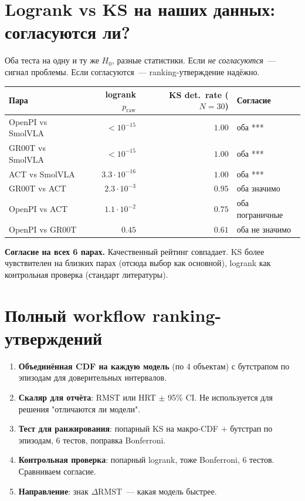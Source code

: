 \documentclass[11pt]{article}
\begin{document}
\section{Logrank vs KS на наших данных: согласуются ли?}

Оба теста на одну и ту же $H_0$, разные статистики. Если \emph{не согласуются}~--- сигнал проблемы. Если согласуются~--- ranking-утверждение надёжно.

\begin{center}
\begin{tabular}{lrrl}
\toprule
Пара & logrank $p_{\text{raw}}$ & KS det.\ rate ($N{=}30$) & Согласие \\
\midrule
OpenPI vs SmolVLA & $<10^{-15}$ & $1.00$ & оба ***  \\
GR00T  vs SmolVLA & $<10^{-15}$ & $1.00$ & оба ***  \\
ACT    vs SmolVLA & $3.3\!\cdot\!10^{-16}$ & $1.00$ & оба ***  \\
GR00T  vs ACT     & $2.3\!\cdot\!10^{-3}$  & $0.95$ & оба значимо \\
OpenPI vs ACT     & $1.1\!\cdot\!10^{-2}$  & $0.75$ & оба пограничные \\
OpenPI vs GR00T   & $0.45$ & $0.61$ & оба не значимо \\
\bottomrule
\end{tabular}
\end{center}

\textbf{Согласие на всех 6 парах.} Качественный рейтинг совпадает. KS более чувствителен на близких парах (отсюда выбор как основной), logrank как контрольная проверка (стандарт литературы).

\section{Полный workflow ranking-утверждений}

\begin{enumerate}[leftmargin=2em, itemsep=2pt]
\item \textbf{Объединённая CDF на каждую модель} (по 4 объектам) с бутстрапом по эпизодам для доверительных интервалов.
\item \textbf{Скаляр для отчёта}: RMST или HRT $\pm$ 95\% CI. Не используется для решения "отличаются ли модели".
\item \textbf{Тест для ранжирования}: попарный KS на макро-CDF $+$ бутстрап по эпизодам, 6 тестов, поправка Bonferroni.
\item \textbf{Контрольная проверка}: попарный logrank, тоже Bonferroni, 6 тестов. Сравниваем согласие.
\item \textbf{Направление}: знак $\Delta\text{RMST}$~--- какая модель быстрее.
\end{enumerate}
\end{document}
